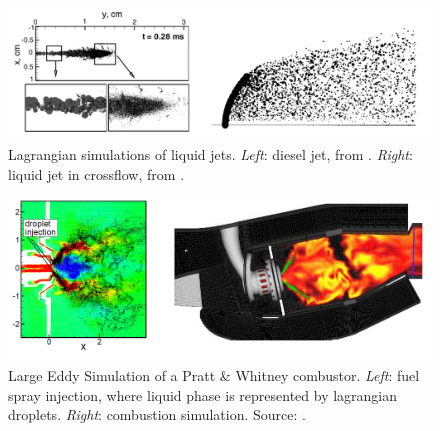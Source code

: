 \begin{figure}[h!]
	\centering
   \includegraphics[scale=0.5]{./part0_intro/jets_lagrangian_simulations}
	\caption[Lagrangian simulations of liquid jets.]{Lagrangian simulations of liquid jets. \textsl{Left}: diesel jet, from  . \textsl{Right}: liquid jet in crossflow, from .}
	\label{fig:lagrangian_simulations_jets}
\end{figure}

\begin{figure}[h!]
	\centering
   \includegraphics[scale=0.45]{./part0_intro/reactive_LES_combustor_Moin}
	\vspace*{-0.2in}
	\caption[Large Eddy Simulation of a Pratt \& Whitney combustor.]{Large Eddy Simulation of a Pratt \& Whitney combustor. \textsl{Left}: fuel spray injection, where liquid phase is represented by lagrangian droplets. \textsl{Right}: combustion simulation. Source: .}
	\label{fig:reactive_LES_combustor_Moin}
\end{figure}

